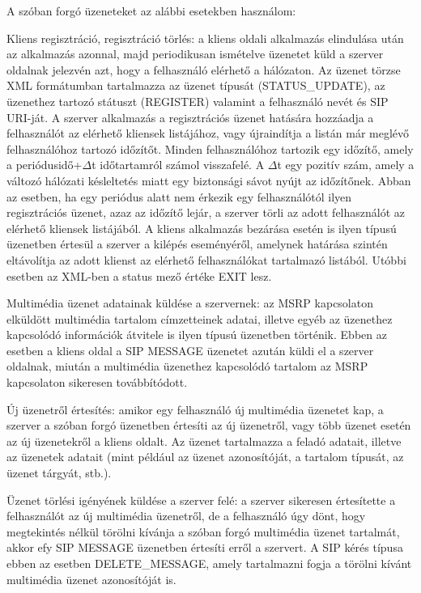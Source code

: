A szóban forgó üzeneteket az alábbi esetekben használom:
\begin{mydescription}
\item[Kliens regisztráció, regisztráció törlés:] a kliens oldali alkalmazás elindulása után az al\-kal\-ma\-zás azonnal, majd periodikusan ismételve üzenetet küld a szerver oldalnak jelezvén azt, hogy a felhasználó elérhető a hálózaton. Az üzenet törzse XML formátumban tartalmazza az üzenet típusát (STATUS\_UPDATE), az üzenethez tartozó státuszt (REGISTER) valamint a felhasználó nevét és SIP URI-ját. A szerver alkalmazás a regisztrációs üzenet hatására hozzáadja a felhasználót az elérhető kliensek listájához, vagy újraindítja a listán már meglévő felhasználóhoz tartozó időzítőt. Minden felhasználóhoz tartozik egy időzítő, amely a periódusidő+$\Delta$t időtartamról számol visszafelé. A $\Delta$t egy pozitív szám, amely a változó hálózati késleltetés miatt egy biztonsági sávot nyújt az időzítőnek. Abban az esetben, ha egy periódus alatt nem érkezik egy felhasználótól ilyen regisztrációs üzenet, azaz az időzítő lejár, a szerver törli az adott felhasználót az elérhető kliensek listájából. A kliens alkalmazás bezárása esetén is ilyen típusú üzenetben értesül a szerver a kilépés eseményéről, amelynek határása szintén eltávolítja az adott klienst az elérhető felhasználókat tartalmazó listából. Utóbbi esetben az XML-ben a status mező értéke EXIT lesz.
\item[Multimédia üzenet adatainak küldése a szervernek:] az MSRP kap\-cso\-la\-ton elküldött multimédia tartalom címzetteinek adatai, illetve egyéb az üzenethez kapcsolódó információk átvitele is ilyen típusú üzenetben történik. Ebben az esetben a kliens oldal a SIP MESSAGE üzenetet azután küldi el a szerver oldalnak, miután a multimédia üzenethez kapcsolódó tartalom az MSRP kapcsolaton sikeresen továbbítódott.
\item[Új üzenetről értesítés:] amikor egy felhasználó új multimédia üzenetet kap, a szerver a szóban forgó üzenetben értesíti az új üzenetről, vagy több üzenet esetén az új üzenetekről a kliens oldalt. Az üzenet tartalmazza a feladó adatait, illetve az üzenetek adatait (mint például az üzenet azonosítóját, a tartalom típusát, az üzenet tárgyát, stb.).
\item[Üzenet törlési igényének küldése a szerver felé:] a szerver sikeresen értesítette a felhasználót az új multimédia üzenetről, de a felhasználó úgy dönt, hogy megtekintés nélkül törölni kívánja a szóban forgó multimédia üzenet tartalmát, akkor efy SIP MESSAGE üzenetben értesíti erről a szervert. A SIP kérés típusa ebben az esetben DELETE\_MESSAGE, amely tartalmazni fogja a törölni kívánt multimédia üzenet azonosítóját is.

\end{mydescription}

